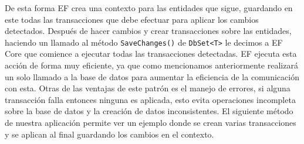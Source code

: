 De esta forma EF crea una contexto para las entidades que sigue, guardando en este todas las transacciones que debe efectuar para aplicar los cambios detectados. Después de hacer cambios y crear transacciones sobre las entidades, haciendo un llamado al método \lstinline{SaveChanges()} de \lstinline{DbSet<T>} le decimos a EF Core que comience a ejecutar todas las transacciones detectadas. EF ejecuta esta acción de forma muy eficiente, ya que como mencionamos anteriormente realizará un solo llamado a la base de datos para aumentar la eficiencia de la comunicación con esta. Otras de las ventajas de este patrón es el manejo de errores, si alguna transacción falla entonces ninguna es aplicada, esto evita operaciones incompleta sobre la base de datos y la creación de datos inconsistentes. El siguiente método de nuestra aplicación permite ver un ejemplo donde se crean varias transacciones y se aplican al final guardando los cambios en el contexto.

